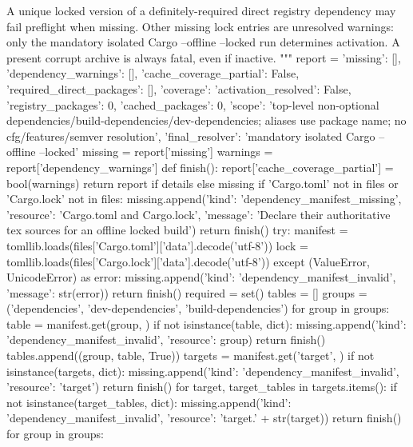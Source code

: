         A unique locked version of a definitely-required direct registry dependency
        may fail preflight when missing. Other missing lock entries are unresolved
        warnings: only the mandatory isolated Cargo --offline --locked run determines
        activation. A present corrupt archive is always fatal, even if inactive.
        """
        report = {'missing': [], 'dependency_warnings': [], 'cache_coverage_partial': False,
                  'required_direct_packages': [], 'coverage': {
                      'activation_resolved': False, 'registry_packages': 0, 'cached_packages': 0,
                      'scope': 'top-level non-optional dependencies/build-dependencies/dev-dependencies; aliases use package name; no cfg/features/semver resolution',
                      'final_resolver': 'mandatory isolated Cargo --offline --locked'}}
        missing = report['missing']
        warnings = report['dependency_warnings']
        def finish():
            report['cache_coverage_partial'] = bool(warnings)
            return report if details else missing
        if 'Cargo.toml' not in files or 'Cargo.lock' not in files:
            missing.append({'kind': 'dependency_manifest_missing', 'resource': 'Cargo.toml and Cargo.lock',
                            'message': 'Declare their authoritative tex sources for an offline locked build'})
            return finish()
        try:
            manifest = tomllib.loads(files['Cargo.toml']['data'].decode('utf-8'))
            lock = tomllib.loads(files['Cargo.lock']['data'].decode('utf-8'))
        except (ValueError, UnicodeError) as error:
            missing.append({'kind': 'dependency_manifest_invalid', 'message': str(error)})
            return finish()
        required = set()
        tables = []
        groups = ('dependencies', 'dev-dependencies', 'build-dependencies')
        for group in groups:
            table = manifest.get(group, {})
            if not isinstance(table, dict):
                missing.append({'kind': 'dependency_manifest_invalid', 'resource': group})
                return finish()
            tables.append((group, table, True))
        targets = manifest.get('target', {})
        if not isinstance(targets, dict):
            missing.append({'kind': 'dependency_manifest_invalid', 'resource': 'target'})
            return finish()
        for target, target_tables in targets.items():
            if not isinstance(target_tables, dict):
                missing.append({'kind': 'dependency_manifest_invalid', 'resource': 'target.' + str(target)})
                return finish()
            for group in groups:
